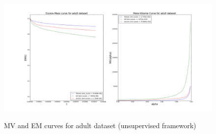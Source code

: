 \begin{figure}[!ht]
  \centering
  \caption{MV and EM curves for adult dataset (unsupervised framework)}
  \includegraphics[trim=172 52 165 70, clip, width=\linewidth]{fig_source/evaluation_fig/mv_em_adult_unsupervised_09_factorized.png}
\label{evaluation:mv_em_adult_unsupervised}
\end{figure}
